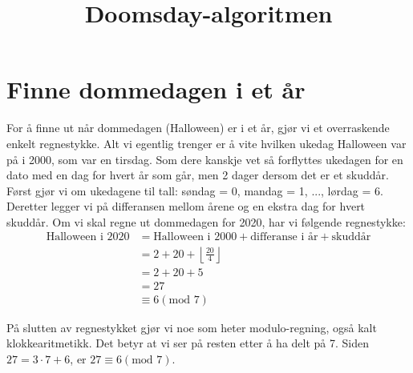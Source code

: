 \documentclass[a4paper,12pt]{article}
\title{Doomsday-algoritmen}
\author{}
\date{}
\begin{document}
\maketitle

\section{Finne dommedagen i et år}
For å finne ut når dommedagen (Halloween) er i et år, gjør vi et overraskende enkelt regnestykke. Alt vi egentlig trenger er å vite hvilken ukedag Halloween var på i 2000, som var en tirsdag. Som dere kanskje vet så forflyttes ukedagen for en dato med en dag for hvert år som går, men 2 dager dersom det er et skuddår. Først gjør vi om ukedagene til tall: søndag = 0, mandag = 1, ..., lørdag = 6. Deretter legger vi på differansen mellom årene og en ekstra dag for hvert skuddår. Om vi skal regne ut dommedagen for 2020, har vi følgende regnestykke:
\begin{align*}
    \text{Halloween i 2020} &= \text{Halloween i 2000} + \text{differanse i år} + \text{skuddår} \\
    &= 2 + 20 + \left\lfloor \frac{20}{4} \right\rfloor \\
    &= 2 + 20 + 5 \\
    &= 27 \\
    &\equiv 6 (\text{mod } 7) 
\end{align*}

På slutten av regnestykket gjør vi noe som heter modulo-regning, også kalt klokkearitmetikk. Det betyr at vi ser på resten etter å ha delt på 7. Siden $27 = 3 \cdot 7 + 6$, er $27 \equiv 6 (\text{mod } 7)$. 
\end{document}
